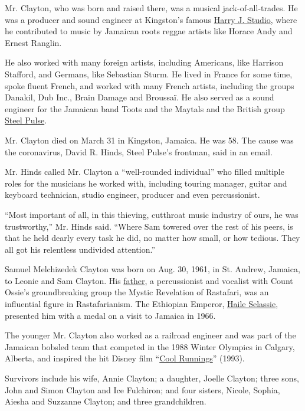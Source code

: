 Mr. Clayton, who was born and raised there, was a musical
jack-of-all-trades. He was a producer and sound engineer at Kingston's
famous \href{https://harryjstudio.com/}{Harry J. Studio}, where he
contributed to music by Jamaican roots reggae artists like Horace Andy
and Ernest Ranglin.

He also worked with many foreign artists, including Americans, like
Harrison Stafford, and Germans, like Sebastian Sturm. He lived in France
for some time, spoke fluent French, and worked with many French artists,
including the groups Danakil, Dub Inc., Brain Damage and Broussaï. He
also served as a sound engineer for the Jamaican band Toots and the
Maytals and the British group \href{https://steelpulse.com/}{Steel
Pulse}.

Mr. Clayton died on March 31 in Kingston, Jamaica. He was 58. The cause
was the coronavirus, David R. Hinds, Steel Pulse's frontman, said in an
email.

Mr. Hinds called Mr. Clayton a ``well-rounded individual'' who filled
multiple roles for the musicians he worked with, including touring
manager, guitar and keyboard technician, studio engineer, producer and
even percussionist.

``Most important of all, in this thieving, cutthroat music industry of
ours, he was trustworthy,'' Mr. Hinds said. ``Where Sam towered over the
rest of his peers, is that he held dearly every task he did, no matter
how small, or how tedious. They all got his relentless undivided
attention.''

Samuel Melchizedek Clayton was born on Aug. 30, 1961, in St. Andrew,
Jamaica, to Leonie and Sam Clayton. His
\href{https://thevinylfactory.com/features/sam-clayton-mystic-revelation-of-rastafari/}{father},
a percussionist and vocalist with Count Ossie's groundbreaking group the
Mystic Revelation of Rastafari, was an influential figure in
Rastafarianism. The Ethiopian Emperor,
\href{https://www.nytimes.com/1975/08/28/archives/haile-selassie-of-ethiopia-dies-at-83-deposed-emperor-ruled-ancient.html}{Haile
Selassie}, presented him with a medal on a visit to Jamaica in 1966.

The younger Mr. Clayton also worked as a railroad engineer and was part
of the Jamaican bobsled team that competed in the 1988 Winter Olympics
in Calgary, Alberta, and inspired the hit Disney film
``\href{https://www.nytimes.com/1993/10/01/movies/reviews-film-not-so-tough-sledding-from-4-unlikely-olympians.html}{Cool
Runnings}'' (1993).

Survivors include his wife, Annie Clayton; a daughter, Joelle Clayton;
three sons, John and Simon Clayton and Ice Fulchiron; and four sisters,
Nicole, Sophia, Aiesha and Suzzanne Clayton; and three grandchildren.

